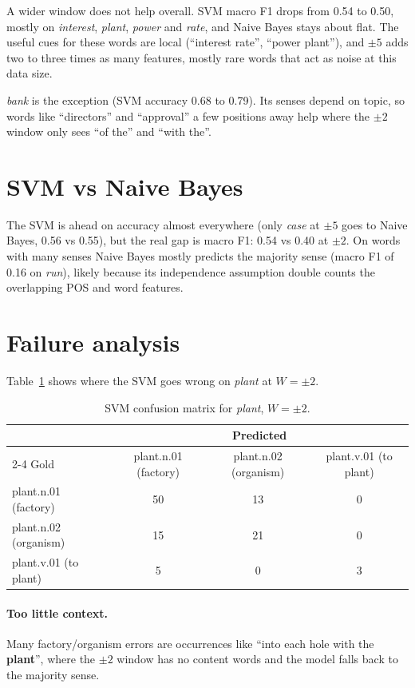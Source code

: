\documentclass[11pt]{article}
\begin{document}
A wider window does not help overall. SVM macro F1 drops from 0.54 to 0.50,
mostly on \emph{interest}, \emph{plant}, \emph{power} and \emph{rate}, and Naive
Bayes stays about flat. The useful cues for these words are local (``interest
rate'', ``power plant''), and $\pm 5$ adds two to three times as many features,
mostly rare words that act as noise at this data size.

\emph{bank} is the exception (SVM accuracy 0.68 to 0.79). Its senses depend on
topic, so words like ``directors'' and ``approval'' a few positions away help
where the $\pm 2$ window only sees ``of the'' and ``with the''.

\section{SVM vs Naive Bayes}

The SVM is ahead on accuracy almost everywhere (only \emph{case} at $\pm 5$
goes to Naive Bayes, 0.56 vs 0.55), but the real gap is macro F1: 0.54 vs 0.40
at $\pm 2$. On words with many senses Naive Bayes mostly predicts the majority
sense (macro F1 of 0.16 on \emph{run}), likely because its independence
assumption double counts the overlapping POS and word features.

\section{Failure analysis}

Table~\ref{tab:plant} shows where the SVM goes wrong on \emph{plant} at
$W = \pm 2$.

\begin{table}[h]
\centering
\small
\begin{tabular}{lccc}
\toprule
& \multicolumn{3}{c}{Predicted} \\
\cmidrule(lr){2-4}
Gold & plant.n.01 (factory) & plant.n.02 (organism) & plant.v.01 (to plant) \\
\midrule
plant.n.01 (factory) & 50 & 13 & 0 \\
plant.n.02 (organism) & 15 & 21 & 0 \\
plant.v.01 (to plant) & 5 & 0 & 3 \\
\bottomrule
\end{tabular}
\caption{SVM confusion matrix for \emph{plant}, $W = \pm 2$.}
\label{tab:plant}
\end{table}

\paragraph{Too little context.} Many factory/organism errors are occurrences
like ``into each hole with the \textbf{plant}'', where the $\pm 2$ window has
no content words and the model falls back to the majority sense.
\end{document}
